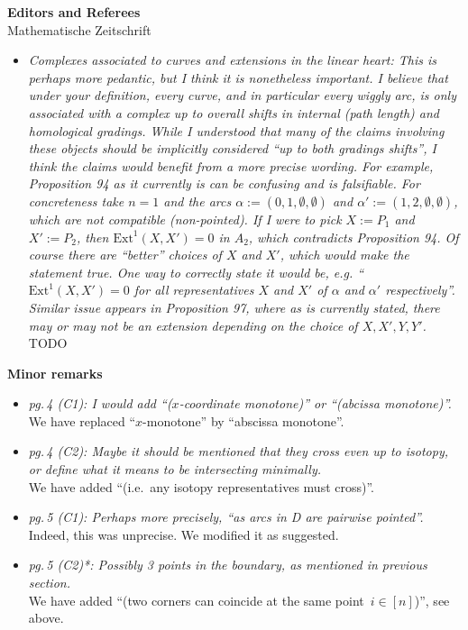 \documentclass{letter}
\begin{document}
\begin{letter}{{\bf Editors and Referees} \\ Mathematische Zeitschrift}
\begin{itemize}
\item \textsl{\color{gray} Complexes associated to curves and extensions in the linear heart: This is perhaps more pedantic, but I think it is nonetheless important. I believe that under your definition, every curve, and in particular every wiggly arc, is only associated with a complex up to overall shifts in internal (path length) and homological gradings. While I understood that many of the claims involving these objects should be implicitly considered “up to both gradings shifts”, I think the claims would benefit from a more precise wording. For example, Proposition 94 as it currently is can be confusing and is falsifiable. For concreteness take $n = 1$ and the arcs $\alpha := (0, 1, \emptyset, \emptyset)$ and $\alpha' := (1, 2, \emptyset, \emptyset)$, which are not compatible (non-pointed). If I were to pick $X := P_1$ and $X' := P_2$, then $\mathrm{Ext}^1(X, X') = 0$ in $A_2$, which contradicts Proposition 94. Of course there are ``better'' choices of $X$ and $X'$, which would make the statement true. One way to correctly state it would be, e.g. ``$\mathrm{Ext}^1(X,X') = 0$ for all representatives $X$ and $X'$ of $\alpha$ and $\alpha'$ respectively''. Similar issue appears in Proposition 97, where as is currently stated, there may or may not be an extension depending on the choice of $X, X', Y, Y'$.} \\
TODO

\end{itemize}

{\bf Minor remarks}

\begin{itemize}
\item \textsl{\color{gray} pg.\,4 (C1): I would add ``($x$-coordinate monotone)'' or ``(abcissa monotone)''.} \\
We have replaced ``$x$-monotone'' by ``abscissa monotone''.

\item \textsl{\color{gray} pg.\,4 (C2): Maybe it should be mentioned that they cross even up to isotopy, or define what it means to be intersecting minimally.} \\
We have added ``(i.e.~any isotopy representatives must cross)''.

\item \textsl{\color{gray} pg.\,5 (C1): Perhaps more precisely, ``as arcs in D are pairwise pointed''.} \\
Indeed, this was unprecise. We modified it as suggested.

\item \textsl{\color{gray} pg.\,5 (C2)*: Possibly 3 points in the boundary, as mentioned in previous section.} \\
We have added ``(two corners can coincide at the same point~$i \in [n]$)'', see above.


\end{itemize}
\end{letter}
\end{document}
